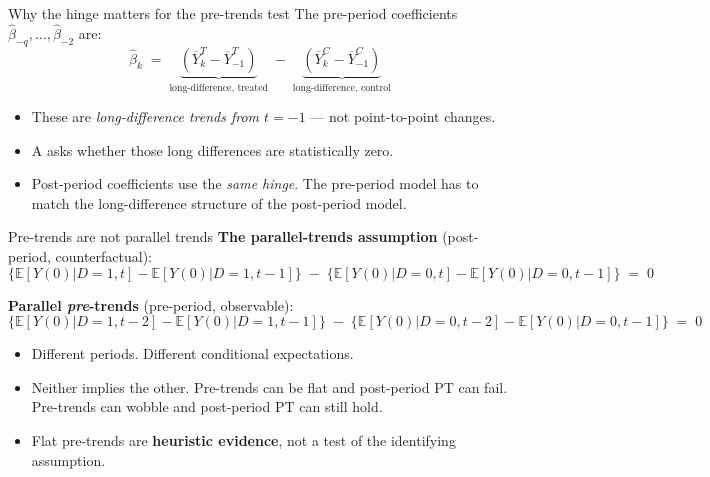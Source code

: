 \documentclass[aspectratio=169,11pt]{beamer}
\begin{document}
\begin{frame}{Why the hinge matters for the pre-trends test}
\vspace{0.4em}
The pre-period coefficients $\hat\beta_{-q}, \ldots, \hat\beta_{-2}$ are:
\vspace{-0.2em}
\[
\hat\beta_k \;=\; \underbrace{(\overline{Y}^T_k - \overline{Y}^T_{-1})}_{\text{long-difference, treated}} \;-\; \underbrace{(\overline{Y}^C_k - \overline{Y}^C_{-1})}_{\text{long-difference, control}}
\]

\vspace{0.4em}
\begin{itemize}\setlength\itemsep{4pt}
  \item These are \textit{long-difference trends from $t = -1$} --- not point-to-point changes.
  \item A  asks whether those long differences are statistically zero.
  \item Post-period coefficients use the \textit{same hinge}. \;The pre-period model has to match the long-difference structure of the post-period model.
\end{itemize}

\vspace{0.3em}
\end{frame}

\begin{frame}{Pre-trends are not parallel trends}
\footnotesize
\textbf{The parallel-trends assumption} (post-period, counterfactual):
\vspace{-0.3em}
\[
\big\{ \mathbb{E}[Y(0)|D{=}1, t] - \mathbb{E}[Y(0)|D{=}1, t{-}1] \big\} \;-\; \big\{ \mathbb{E}[Y(0)|D{=}0, t] - \mathbb{E}[Y(0)|D{=}0, t{-}1] \big\} \;=\; 0
\]

\vspace{-0.4em}
\textbf{Parallel \textit{pre}-trends} (pre-period, observable):
\vspace{-0.3em}
\[
\big\{ \mathbb{E}[Y(0)|D{=}1, t{-}2] - \mathbb{E}[Y(0)|D{=}1, t{-}1] \big\} \;-\; \big\{ \mathbb{E}[Y(0)|D{=}0, t{-}2] - \mathbb{E}[Y(0)|D{=}0, t{-}1] \big\} \;=\; 0
\]

\vspace{0.4em}
\begin{itemize}\setlength\itemsep{3pt}
  \item Different periods. \;Different conditional expectations. \;
  \item Neither implies the other. \;Pre-trends can be flat and post-period PT can fail. \;Pre-trends can wobble and post-period PT can still hold.
  \item Flat pre-trends are \textbf{heuristic evidence}, not a test of the identifying assumption.
\end{itemize}
\end{frame}
\end{document}
